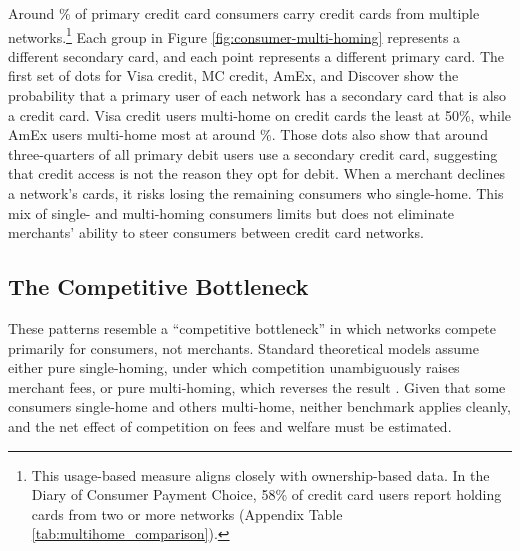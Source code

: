\documentclass[main.tex]{subfiles}
\begin{document}
Around \% of primary credit card consumers carry credit cards from multiple networks.\footnote{
    This usage-based measure aligns closely with ownership-based data. In the Diary of Consumer Payment Choice, 58\% of credit card users report holding cards from two or more networks (Appendix Table \ref{tab:multihome_comparison}).
}
Each group in Figure \ref{fig:consumer-multi-homing} represents a different secondary card, and each point represents a different primary card.
The first set of dots for Visa credit, MC credit, AmEx, and Discover show the probability that a primary user of each network has a secondary card that is also a credit card.
Visa credit users multi-home on credit cards the least at 50\%,
while AmEx users multi-home most at around \%.
Those dots also show that around three-quarters of all primary debit users use a secondary credit card, suggesting that credit access is not the reason they opt for debit.
When a merchant declines a network's cards, it risks losing the remaining consumers who single-home.
This mix of single- and multi-homing consumers limits but does not eliminate merchants' ability to steer consumers between credit card networks.

\subsection{The Competitive Bottleneck}

These patterns resemble a ``competitive bottleneck'' in which networks compete primarily for consumers, not merchants.
Standard theoretical models assume either pure single-homing, under which competition unambiguously raises merchant fees, or pure multi-homing, which reverses the result \parencite{Anderson.etal2018, Bakos.Halaburda2020}.
Given that some consumers single-home and others multi-home, neither benchmark applies cleanly, and the net effect of competition on fees and welfare must be estimated.
\end{document}
